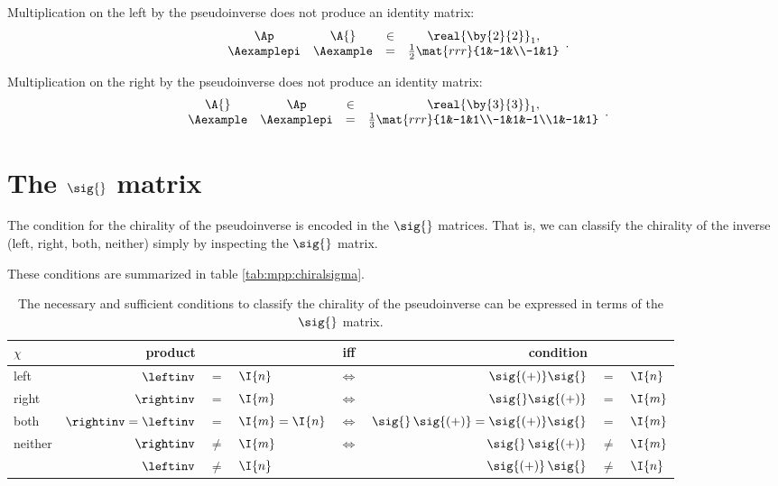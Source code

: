 Multiplication on the left by the pseudoinverse does not produce an identity matrix:
\begin{equation*}
  \begin{array}{cccc}
  \Ap&\A{}&\in&\real{\by{2}{2}}_{1},\\
  \Aexamplepi &
  \Aexample 
   & = &
  \frac{1}{2}
  \mat{rrr}{1&-1&\\-1&1}
  \end{array}.
\end{equation*}

%
Multiplication on the right by the pseudoinverse does not produce an identity matrix:
\begin{equation*}
  \begin{array}{cccc}
  \A{}&\Ap&\in&\real{\by{3}{3}}_{1},\\
  \Aexample &
  \Aexamplepi
   & = &
  \frac{1}{3}
  \mat{rrr}{1&-1&1\\-1&1&-1\\1&-1&1}
  \end{array}.
\end{equation*}

\section{The $\sig{}$ matrix}
The condition for the chirality of the pseudoinverse is encoded in the $\sig{}$ matrices. That is, we can classify the chirality of the inverse (left, right, both, neither) simply by inspecting the $\sig{}$ matrix. 

These conditions are summarized in table \eqref{tab:mpp:chiralsigma}.
\begin{table}[htdp]
\begin{center}
%
\begin{tabular}{l|rclcrcl}
    $\chi$  & product  && & iff & condition \\\hline
    left  & $\leftinv$  &$=$& $\I{n}$ & $\iff$ & $\sig{(+)}\sig{}$ &=& $\I{n}$\\
    right & $\rightinv$ &$=$& $\I{m}$ & $\iff$ & $\sig{}\sig{(+)}$ &=& $\I{m}$\\
    both  & $\rightinv = \leftinv$ &$=$& $\I{m}=\I{n}$ & $\iff$ & $\sig{}\,\sig{(+)}=\sig{(+)}\sig{}$ &=& $\I{m}$\\
    neither  & $\rightinv $ &$\ne$& $\I{m}$ & $\iff$ & $\sig{}\,\sig{(+)}$ &$\ne$& $\I{m}$\\
             & $\leftinv $  &$\ne$& $\I{n}$ &        & $\sig{(+)}\,\sig{}$ &$\ne$& $\I{n}$\\[5pt]
\end{tabular}
%
\end{center}
\label{tab:mpp:chiralsigma}
\caption[Necessary and sufficient conditions to classify chirality]{The necessary and sufficient conditions to classify the chirality of the pseudoinverse can be expressed in terms of the $\sig{}$ matrix.}
\end{table}%

